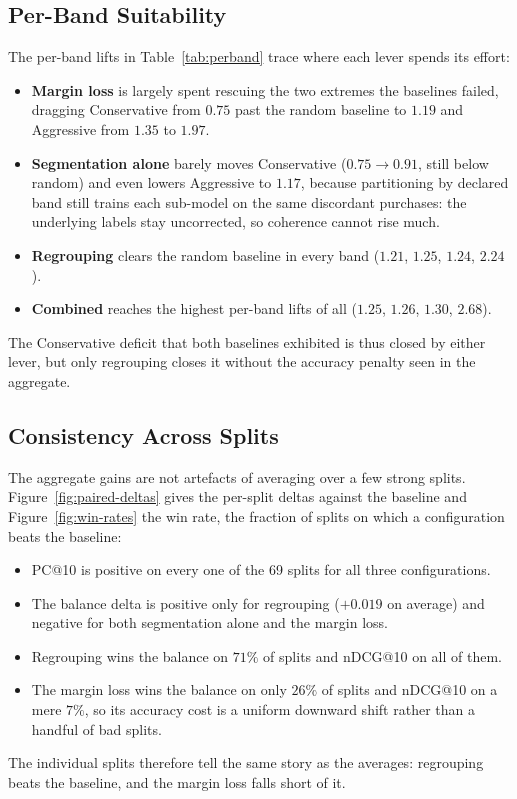 \subsection{Per-Band Suitability}
\label{sec:results:perband}
The per-band lifts in Table~\ref{tab:perband} trace where each lever spends its effort:
\begin{itemize}
    \item \textbf{Margin loss} is largely spent rescuing the two extremes the baselines failed, dragging Conservative from $0.75$ past the random baseline to $1.19$ and Aggressive from $1.35$ to $1.97$.
    \item \textbf{Segmentation alone} barely moves Conservative ($0.75 \to 0.91$, still below random) and even lowers Aggressive to $1.17$, because partitioning by declared band still trains each sub-model on the same discordant purchases: the underlying labels stay uncorrected, so coherence cannot rise much.
    \item \textbf{Regrouping} clears the random baseline in every band ($1.21$, $1.25$, $1.24$, $2.24$).
    \item \textbf{Combined} reaches the highest per-band lifts of all ($1.25$, $1.26$, $1.30$, $2.68$).
\end{itemize}
The Conservative deficit that both baselines exhibited is thus closed by either lever, but only regrouping closes it without the accuracy penalty seen in the aggregate.

\subsection{Consistency Across Splits}
\label{sec:results:splits}
The aggregate gains are not artefacts of averaging over a few strong splits. Figure~\ref{fig:paired-deltas} gives the per-split deltas against the baseline and Figure~\ref{fig:win-rates} the win rate, the fraction of splits on which a configuration beats the baseline:
\begin{itemize}
    \item PC@10 is positive on every one of the 69 splits for all three configurations.
    \item The balance delta is positive only for regrouping ($+0.019$ on average) and negative for both segmentation alone and the margin loss.
    \item Regrouping wins the balance on $71\%$ of splits and nDCG@10 on all of them.
    \item The margin loss wins the balance on only $26\%$ of splits and nDCG@10 on a mere $7\%$, so its accuracy cost is a uniform downward shift rather than a handful of bad splits.
\end{itemize}
The individual splits therefore tell the same story as the averages: regrouping beats the baseline, and the margin loss falls short of it.

